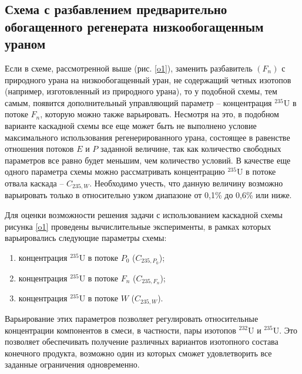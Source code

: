 \subsection{Схема с разбавлением предварительно обогащенного регенерата низкообогащенным ураном}\label{ch2_1_1}

Если в схеме, рассмотренной выше (рис. \ref{o1}), заменить разбавитель $(F_n)$ с природного урана на низкообогащенный уран, не содержащий четных изотопов (например, изготовленный из природного урана), то у подобной схемы, тем самым, появится дополнительный управляющий параметр -- концентрация $^{235}$U в потоке $F_n$, которую можно также варьировать.  Несмотря на это, в подобном варианте каскадной схемы все еще может быть не выполнено условие максимального использования регенерированного урана, состоящее в равенстве отношения потоков $E$ и $P$ заданной величине, так как количество свободных параметров все равно будет меньшим, чем количество условий. В качестве еще одного параметра схемы можно рассматривать концентрацию $^{235}$U в потоке отвала каскада -- $C_{235, W}$. Необходимо учесть, что данную величину возможно варьировать только в относительно узком диапазоне от 0,1\% до 0,6\% или ниже. 

Для оценки возможности решения задачи с использованием каскадной схемы рисунка \ref{o1} проведены вычислительные эксперименты, в рамках которых варьировались следующие параметры схемы:
\begin{enumerate}
  \item концентрация $^{235}$U в потоке $P_0$ ($C_{235, P_0}$);
  \item концентрация $^{235}$U в потоке $F_n$ ($C_{235, F_n}$);
  \item концентрация $^{235}$U в потоке $W$ ($C_{235, W}$).
\end{enumerate}

Варьирование этих параметров позволяет регулировать относительные концентрации компонентов в смеси, в частности, пары изотопов $^{232}$U и $^{235}$U. Это позволяет обеспечивать получение различных вариантов изотопного состава конечного продукта, возможно один из которых сможет удовлетворить все заданные ограничения одновременно. 

